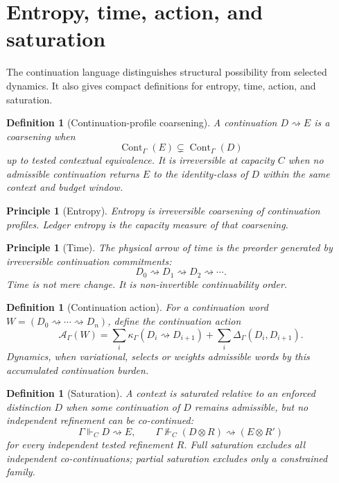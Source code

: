 \documentclass[11pt]{article}
\newtheorem{definition}[theorem]{Definition}
\newtheorem{principle}[theorem]{Principle}
\theoremstyle{remark}
\newcommand{\G}{\Gamma}
\newcommand{\entails}{\Vdash}
\newcommand{\goes}{\rightsquigarrow}
\newcommand{\Cont}{\operatorname{Cont}}
\newcommand{\Cost}{\kappa}
\begin{document}
\section{Entropy, time, action, and saturation}

The continuation language distinguishes structural possibility from selected dynamics.  It also gives compact definitions for entropy, time, action, and saturation.

\begin{definition}[Continuation-profile coarsening]
A continuation \(D\goes E\) is a coarsening when
\[
        \Cont_\G(E)\subsetneq \Cont_\G(D)
\]
up to tested contextual equivalence.  It is irreversible at capacity \(C\) when no admissible continuation returns \(E\) to the identity-class of \(D\) within the same context and budget window.
\end{definition}

\begin{principle}[Entropy]
Entropy is irreversible coarsening of continuation profiles.  Ledger entropy is the capacity measure of that coarsening.
\end{principle}

\begin{principle}[Time]
The physical arrow of time is the preorder generated by irreversible continuation commitments:
\[
        D_0\goes D_1\goes D_2\goes\cdots .
\]
Time is not mere change.  It is non-invertible continuability order.
\end{principle}

\begin{definition}[Continuation action]
For a continuation word \(W=(D_0\goes\cdots\goes D_n)\), define the continuation action
\[
        \mathcal A_\G(W)
        =
        \sum_i \Cost_\G(D_i\goes D_{i+1})
        +
        \sum_i \Delta_\G(D_i,D_{i+1}).
\]
Dynamics, when variational, selects or weights admissible words by this accumulated continuation burden.
\end{definition}

\begin{definition}[Saturation]
A context is saturated relative to an enforced distinction \(D\) when some continuation of \(D\) remains admissible, but no independent refinement can be co-continued:
\[
        \G\entails_C D\goes E,
        \qquad
        \G\nVdash_C (D\otimes R)\goes(E\otimes R')
\]
for every independent tested refinement \(R\).  Full saturation excludes all independent co-continuations; partial saturation excludes only a constrained family.
\end{definition}
\end{document}

